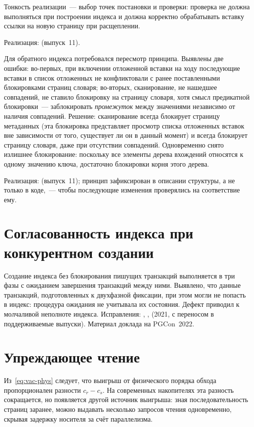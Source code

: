 Тонкость реализации~--- выбор точек постановки и проверки: проверка не должна
выполняться при построении индекса и должна корректно обрабатывать вставку
ссылки на новую страницу при расщеплении.

Реализация:  (выпуск~11).

Для обратного индекса потребовался пересмотр принципа. Выявлены две ошибки:
во-первых, при включении отложенной вставки на ходу последующие вставки в
список отложенных не конфликтовали с ранее поставленными блокировками страниц
словаря; во-вторых, сканирование, не нашедшее совпадений, не ставило блокировку
на страницу словаря, хотя смысл предикатной блокировки~--- заблокировать
\emph{промежуток} между значениями независимо от наличия совпадений.
Решение: сканирование всегда блокирует страницу метаданных (эта блокировка
представляет просмотр списка отложенных вставок вне зависимости от того,
существует ли он в данный момент) и всегда блокирует страницу словаря, даже при
отсутствии совпадений. Одновременно снято излишнее блокирование: поскольку все
элементы дерева вхождений относятся к одному значению ключа, достаточно
блокировки корня этого дерева.

Реализация: 
(выпуск~11); принцип зафиксирован в описании структуры, а не только в коде,~---
чтобы последующие изменения проверялись на соответствие ему.

\section{Согласованность индекса при конкурентном создании}

Создание индекса без блокирования пишущих транзакций выполняется в три фазы с
ожиданием завершения транзакций между ними. Выявлено, что данные транзакций,
подготовленных к двухфазной фиксации, при этом могли не попасть в индекс:
процедура ожидания не учитывала их состояния. Дефект приводил к молчаливой
неполноте индекса. Исправления: , ,
 (2021, с переносом в поддерживаемые выпуски). Материал
доклада на PGCon~2022.

\section{Упреждающее чтение}
\label{sec:read-stream}

Из~\eqref{eq:vac-phys} следует, что выигрыш от физического порядка обхода
пропорционален разности $c_r-c_s$. На современных накопителях эта разность
сокращается, но появляется другой источник выигрыша: зная последовательность
страниц заранее, можно выдавать несколько запросов чтения одновременно,
скрывая задержку носителя за счёт параллелизма.

